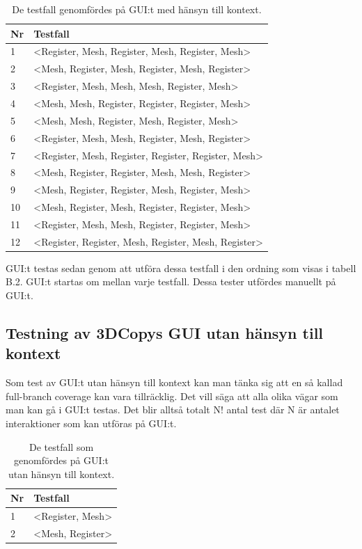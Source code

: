 \begin{table}[h]
	\caption{De testfall genomfördes på GUI:t med hänsyn till kontext.}
	\centering
	\begin{tabular}{|l|l|}
		\hline
		\textbf{Nr} & \textbf{Testfall} \\
		\hline
		1 & <Register, Mesh, Register, Mesh, Register, Mesh> \\
		\hline
		2 & <Mesh, Register, Mesh, Register, Mesh, Register> \\
		\hline
		3 & <Register, Mesh, Mesh, Mesh, Register, Mesh> \\
		\hline
		4 & <Mesh, Mesh, Register, Register, Register, Mesh> \\
		\hline
		5 & <Mesh, Mesh, Register, Mesh, Register, Mesh> \\
		\hline
		6 & <Register, Mesh, Mesh, Register, Mesh, Register> \\
		\hline
		7 & <Register, Mesh, Register, Register, Register, Mesh> \\
		\hline
		8 & <Mesh, Register, Register, Mesh, Mesh, Register> \\
		\hline
		9 & <Mesh, Register, Register, Mesh, Register, Mesh> \\
		\hline
		10 & <Mesh, Register, Mesh, Register, Register, Mesh> \\
		\hline
		11 & <Register, Mesh, Mesh, Register, Register, Mesh> \\
		\hline
		12 & <Register, Register, Mesh, Register, Mesh, Register> \\
		\hline
	\end{tabular}
\end{table}

GUI:t testas sedan genom att utföra dessa testfall i den ordning som visas i tabell B.2. GUI:t startas om mellan varje testfall. Dessa tester utfördes manuellt på GUI:t.

\subsection{Testning av 3DCopys GUI utan hänsyn till kontext}

Som test av GUI:t utan hänsyn till kontext kan man tänka sig att en så kallad full-branch coverage kan vara tillräcklig. Det vill säga att alla olika vägar som man kan gå i GUI:t testas. Det blir alltså totalt N! antal test där N är antalet interaktioner som kan utföras på GUI:t.

\begin{table}[h]
	\caption{De testfall som genomfördes på GUI:t utan hänsyn till kontext.}
	\centering
	\begin{tabular}{|l|l|}
		\hline
		\textbf{Nr} & \textbf{Testfall} \\
		\hline
		1 & <Register, Mesh> \\
		\hline
		2 & <Mesh, Register> \\
		\hline
	\end{tabular}
\end{table}

